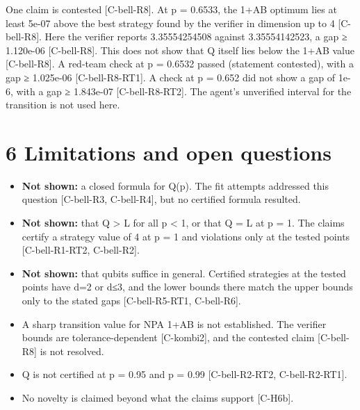 \documentclass[10pt,twocolumn]{article}
\begin{document}
One claim is contested {\scriptsize[C-bell-R8]}. At p = 0.6533, the 1+AB optimum lies at least 5e-07 above the best strategy found by the verifier in dimension up to 4 {\scriptsize[C-bell-R8]}. Here the verifier reports 3.35554254508 against 3.35554142523, a gap ≥ 1.120e-06 {\scriptsize[C-bell-R8]}. This does not show that Q itself lies below the 1+AB value {\scriptsize[C-bell-R8]}. A red-team check at p = 0.6532 passed (statement contested), with a gap ≥ 1.025e-06 {\scriptsize[C-bell-R8-RT1]}. A check at p = 0.652 did not show a gap of 1e-6, with a gap ≥ 1.843e-07 {\scriptsize[C-bell-R8-RT2]}. The agent's unverified interval for the transition is not used here.

\section{6 Limitations and open questions}

\begin{itemize}
\item \textbf{Not shown:} a closed formula for Q(p). The fit attempts addressed this question {\scriptsize[C-bell-R3, C-bell-R4]}, but no certified formula resulted.
\item \textbf{Not shown:} that Q > L for all p < 1, or that Q = L at p = 1. The claims certify a strategy value of 4 at p = 1 and violations only at the tested points {\scriptsize[C-bell-R1-RT2, C-bell-R2]}.
\item \textbf{Not shown:} that qubits suffice in general. Certified strategies at the tested points have d=2 or d≤3, and the lower bounds there match the upper bounds only to the stated gaps {\scriptsize[C-bell-R5-RT1, C-bell-R6]}.
\item A sharp transition value for NPA 1+AB is not established. The verifier bounds are tolerance-dependent {\scriptsize[C-kombi2]}, and the contested claim {\scriptsize[C-bell-R8]} is not resolved.
\item Q is not certified at p = 0.95 and p = 0.99 {\scriptsize[C-bell-R2-RT2, C-bell-R2-RT1]}.
\item No novelty is claimed beyond what the claims support {\scriptsize[C-H6b]}.
\end{itemize}
\end{document}

